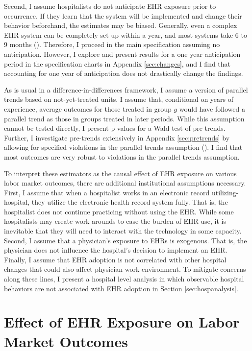 \documentclass[12pt]{article}
\begin{document}
Second, I assume hospitalists do not anticipate EHR exposure prior to occurrence. If they learn that the system will be implemented and change their behavior beforehand, the estimates may be biased. Generally, even a complex EHR system can be completely set up within a year, and most systems take 6 to 9 months (\cite{uzialko_2021}). Therefore, I proceed in the main specification assuming no anticipation. However, I explore and present results for a one year anticipation period in the specification charts in Appendix \ref{sec:changes}, and I find that accounting for one year of anticipation does not drastically change the findings.  

As is usual in a difference-in-differences framework, I assume a version of parallel trends based on not-yet-treated units. I assume that, conditional on years of experience, average outcomes for those treated in group $g$ would have followed a parallel trend as those in groups treated in later periods. While this assumption cannot be tested directly, I present p-values for a Wald test of pre-trends. Further, I investigate pre-trends extensively in Appendix \ref{sec:pretrends} by allowing for specified violations in the parallel trends assumption (\cite{rambachan2019honest}). I find that most outcomes are very robust to violations in the parallel trends assumption. 

To interpret these estimators as the causal effect of EHR exposure on various labor market outcomes, there are additional institutional assumptions necessary. First, I assume that when a hospitalist works in an electronic record utilizing-hospital, they utilize the electronic health record system fully. That is, the hospitalist does not continue practicing without using the EHR. While some hospitalists may create work-arounds to ease the burden of EHR use, it is inevitable that they will need to interact with the technology in some capacity. Second, I assume that a physician's exposure to EHRs is exogenous. That is, the physician does not influence the hospital's decision to implement an EHR. Finally, I assume that EHR adoption is not correlated with other hospital changes that could also affect physician work environment. To mitigate concerns along these lines, I present a hospital level analysis in which observable hospital behaviors are not associated with EHR adoption in Section \ref{sec:hospanalysis}.


\section{Effect of EHR Exposure on Labor Market Outcomes}
\end{document}
